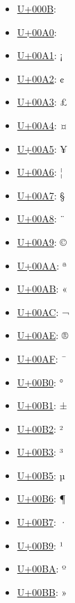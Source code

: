 \begin{itemize}
	\item \href{https://decodeunicode.org/en/u+000B}{U+000B}: 
	\item \href{https://decodeunicode.org/en/u+00A0}{U+00A0}:  
	\item \href{https://decodeunicode.org/en/u+00A1}{U+00A1}: ¡
	\item \href{https://decodeunicode.org/en/u+00A2}{U+00A2}: ¢
	\item \href{https://decodeunicode.org/en/u+00A3}{U+00A3}: £
	\item \href{https://decodeunicode.org/en/u+00A4}{U+00A4}: ¤
	\item \href{https://decodeunicode.org/en/u+00A5}{U+00A5}: ¥
	\item \href{https://decodeunicode.org/en/u+00A6}{U+00A6}: ¦
	\item \href{https://decodeunicode.org/en/u+00A7}{U+00A7}: §
	\item \href{https://decodeunicode.org/en/u+00A8}{U+00A8}: ¨
	\item \href{https://decodeunicode.org/en/u+00A9}{U+00A9}: ©
	\item \href{https://decodeunicode.org/en/u+00AA}{U+00AA}: ª
	\item \href{https://decodeunicode.org/en/u+00AB}{U+00AB}: «
	\item \href{https://decodeunicode.org/en/u+00AC}{U+00AC}: ¬
	\item \href{https://decodeunicode.org/en/u+00AE}{U+00AE}: ®
	\item \href{https://decodeunicode.org/en/u+00AF}{U+00AF}: ¯
	\item \href{https://decodeunicode.org/en/u+00B0}{U+00B0}: °
	\item \href{https://decodeunicode.org/en/u+00B1}{U+00B1}: ±
	\item \href{https://decodeunicode.org/en/u+00B2}{U+00B2}: ²
	\item \href{https://decodeunicode.org/en/u+00B3}{U+00B3}: ³
	\item \href{https://decodeunicode.org/en/u+00B5}{U+00B5}: µ
	\item \href{https://decodeunicode.org/en/u+00B6}{U+00B6}: ¶
	\item \href{https://decodeunicode.org/en/u+00B7}{U+00B7}: ·
	\item \href{https://decodeunicode.org/en/u+00B9}{U+00B9}: ¹
	\item \href{https://decodeunicode.org/en/u+00BA}{U+00BA}: º
	\item \href{https://decodeunicode.org/en/u+00BB}{U+00BB}: »

\end{itemize}
